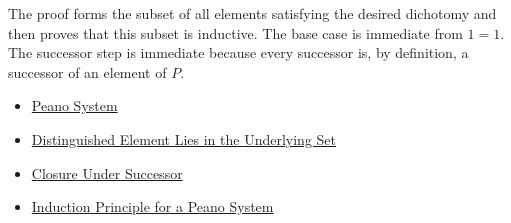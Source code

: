 \begin{remark*}
The proof forms the subset of all elements satisfying the desired dichotomy
and then proves that this subset is inductive. The base case is immediate
from $1=1$. The successor step is immediate because every successor is, by
definition, a successor of an element of $P$.
\end{remark*}

\begin{dependencies}
\begin{itemize}
  \item \hyperref[def:peano-system]{Peano System}
  \item \hyperref[ax:peano-one-in-n]{Distinguished Element Lies in the Underlying Set}
  \item \hyperref[ax:peano-successor-closure]{Closure Under Successor}
  \item \hyperref[thm:induction-principle-for-peano-system]{Induction Principle for a Peano System}
\end{itemize}
\end{dependencies}

